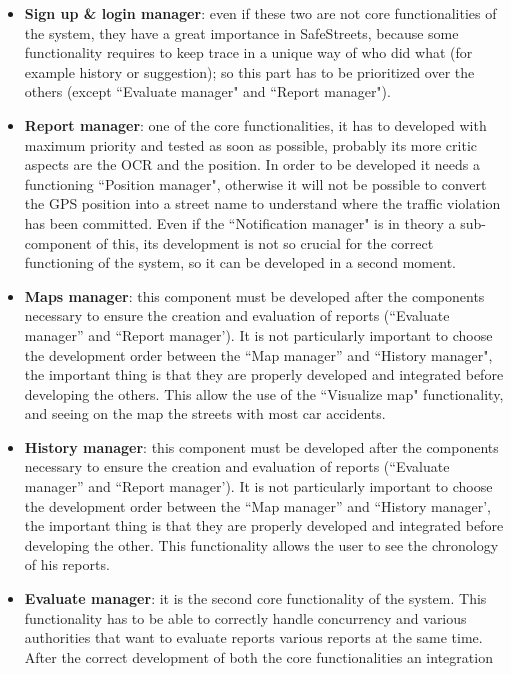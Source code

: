 \documentclass[12pt,a4paper]{report}
\begin{document}
			\begin{itemize}
				\item \textbf{Sign up \& login manager}: even if these two are not core functionalities of the system, they have a
					great importance in SafeStreets, because some functionality requires to keep trace in a unique way of
					who did what (for example history or suggestion); so this part has to be prioritized over the others
					(except ``Evaluate manager" and ``Report manager"). 
				\item \textbf{Report manager}: one of the core functionalities, it has to developed with maximum priority
					and tested as soon as possible, probably its more critic aspects are the OCR and the position. In order
					to be developed it needs a functioning ``Position manager", otherwise it will not be possible to convert
					the GPS position into a street name to understand where the traffic violation has been committed.
					Even if the ``Notification manager"  is in theory a sub-component of this, its development is not so
					crucial for the correct functioning of the system, so it can be developed in a second moment.  
				\item \textbf{Maps manager}: this component must be developed after the components necessary to
					ensure the creation and evaluation of reports (``Evaluate manager'' and ``Report manager'). It is not
					particularly important to choose the development order between the ``Map manager'' and ``History
					manager", the important thing is that they are properly developed and integrated before developing
					the others. This allow the use of the ``Visualize map" functionality, and seeing on the map the streets with
					most car accidents.
				\item \textbf{History manager}:  this component must be developed after the components necessary to
					ensure the creation and evaluation of reports (``Evaluate manager'' and ``Report manager'). It is not
					particularly important to choose the development order between the ``Map manager'' and ``History
					manager', the important thing is that they are properly developed and integrated before developing
					the other. This functionality allows the user to see the chronology of his reports.
				\item \textbf{Evaluate manager}: it is the second core functionality of the system. This functionality has to be
					able to correctly handle concurrency and various authorities that want to evaluate reports various
					reports at the same time. After the correct development of both the core functionalities an integration

\end{itemize}
\end{document}

